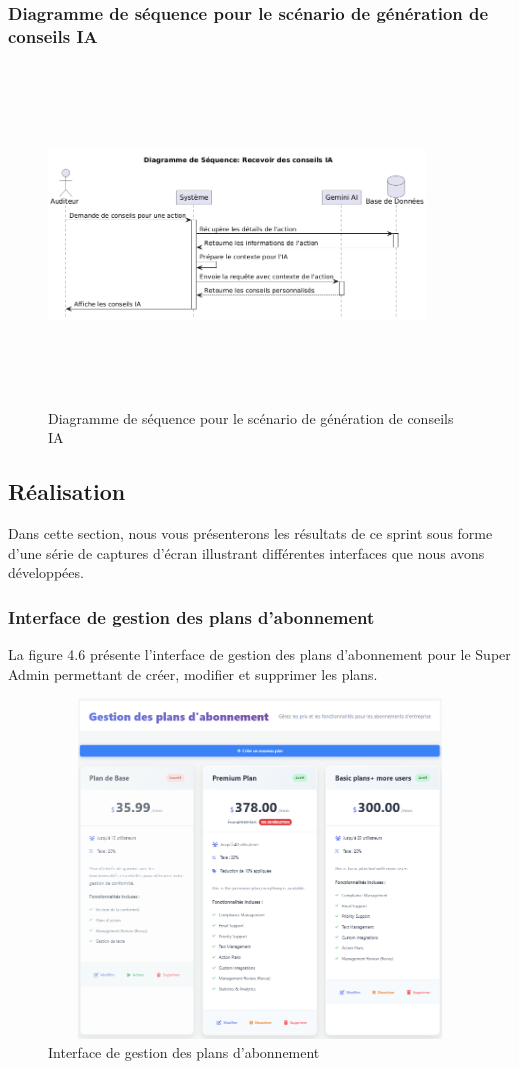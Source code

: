 \subsubsection{Diagramme de séquence pour le scénario de génération de conseils IA}
\begin{figure}[H]
    \centering
    \includegraphics[width=10cm,height=9cm]{images/aiconseilseq.png}
    \caption{Diagramme de séquence pour le scénario de génération de conseils IA}
\end{figure}

\subsection{Réalisation}
\noindent Dans cette section, nous vous présenterons les résultats de ce sprint sous forme d'une série de captures d'écran illustrant différentes interfaces que nous avons développées.

\subsubsection{Interface de gestion des plans d'abonnement}
\noindent La figure 4.6 présente l'interface de gestion des plans d'abonnement pour le Super Admin permettant de créer, modifier et supprimer les plans.

\begin{figure}[H]
    \centering
    \includegraphics[width=13cm,height=9cm]{images/gestionplansinterface.PNG}
    \caption{Interface de gestion des plans d'abonnement}
\end{figure}

